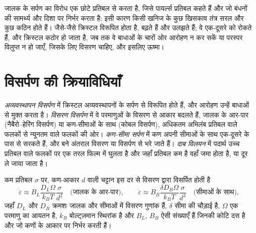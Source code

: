 जालक  के सर्पण का विरोध एक छोटे प्रतिबल से करता है, जिसे
पायर्ल्स प्रतिबल कहते हैं और जो बंधनों की सामर्थ्य और दिशा पर निर्भर करता है:
इसी कारण किसी खनिज के कुछ खिसकाव तंत्र सरल और कुछ कठिन होते हैं। जैसे-जैसे
क्रिस्टल विरूपित होता है,  बढ़ते हैं और उलझते हैं; वे एक-दूसरे को रोकते हैं, और
क्रिस्टल कठोर हो जाता है, जब तक वे बाधाओं के चारों ओर आरोहण न कर सकें या परस्पर विलुप्त न हो जाएँ, जिसके लिए
विसरण चाहिए, और इसलिए ऊष्मा।

\section{विसर्पण की क्रियाविधियाँ}

\begin{definition}[विसर्पण की क्रियाविधियाँ]\label{def:b3:deformation-mechanisms:creep}
\emph{अव्यवस्थापन विसर्पण} में क्रिस्टल अव्यवस्थापनों के
सर्पण से विरूपित होते हैं, और आरोहण उन्हें बाधाओं से मुक्त करता है।
\emph{विसरण विसर्पण} में वे परमाणुओं के विसरण से आकार बदलते हैं,
जालक के आर-पार (नैबैरो--हेरिंग विसर्पण) या कण-सीमाओं के साथ (कोबल विसर्पण),
अधिकतम अभिलंब प्रतिबल वाले फलकों से
न्यूनतम वाले फलकों की ओर। \emph{कण-सीमा सर्पण} में
कण अपनी सीमाओं के साथ एक-दूसरे के पास से सरकते हैं, और बने अंतराल
विसरण या  विसर्पण से भरे जाते हैं।
\emph{दाब विलयन} में पदार्थ उच्च प्रतिबल वाले फलकों पर एक
तरल फिल्म में घुलता है और जहाँ प्रतिबल कम है वहाँ जमा होता है, या
दूर ले जाया जाता है।
\end{definition}

\begin{proposition}\label{prop:b3:deformation-mechanisms:grain-size}
कम प्रतिबल $\sigma$ पर, कण-आकार $d$ वाली चट्टान इस दर से विसरण द्वारा विसर्पित होती है
\[
  \dot\varepsilon \approx B_L\frac{D_L\Omega}{k_BT}\frac{\sigma}{d^2}
  \quad\text{(जालक के आर-पार)},\qquad
  \dot\varepsilon \approx B_B\frac{\delta D_B\Omega}{k_BT}\frac{\sigma}{d^3}
  \quad\text{(सीमाओं के साथ)},
\]
जहाँ $D_L$ और $D_B$ क्रमशः जालक और सीमाओं में विसरण गुणांक हैं,
$\delta$ सीमा की चौड़ाई है, $\Omega$ एक परमाणु का आयतन है,
$k_B$ बोल्ट्ज़मान स्थिरांक है और $B_L$, $B_B$ ऐसी संख्याएँ हैं जिनकी कोटि दस है और जो
कणों के आकार पर निर्भर करती हैं।
\end{proposition}


